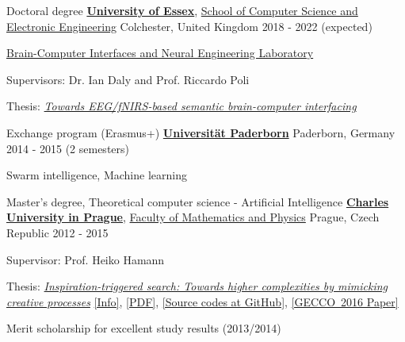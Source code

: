 

\begin{cventries}

  \cventry
    {Doctoral degree} %
    {\href{https://www.essex.ac.uk}{\textbf{University of Essex}}, \href{https://www.essex.ac.uk/departments/computer-science-and-electronic-engineering}{School of Computer Science and Electronic Engineering}} %
    {Colchester, United Kingdom} %
    {2018 - 2022 (expected)} %
    {
      \begin{cvitems} %
        \item {\href{http://essexbcis.uk}{Brain-Computer Interfaces and Neural Engineering Laboratory}}
        \item {Supervisors: Dr. Ian Daly and Prof. Riccardo Poli}
        \item {Thesis: \href{http://milanrybar.cz/semantic-brain-computer-interfacing}{\emph{Towards EEG/fNIRS-based semantic brain-computer interfacing}}}
      \end{cvitems}
    }

  \cventry
{Exchange program (Erasmus+)} %
{\href{http://www.uni-paderborn.de}{\textbf{Universität Paderborn}}} %
{Paderborn, Germany} %
{2014 - 2015 (2 semesters)} %
{
	\begin{cvitems} %
		\item {Swarm intelligence, Machine learning}
	\end{cvitems}
}

  \cventry
{Master's degree, Theoretical computer science - Artificial Intelligence} %
{\href{http://cuni.cz}{\textbf{Charles University in Prague}}, \href{http://www.mff.cuni.cz}
	{Faculty of Mathematics and Physics}} %
{Prague, Czech Republic} %
{2012 - 2015} %
{
	\begin{cvitems} %
		\item {Supervisor: Prof. Heiko Hamann}
		\item {Thesis: \href{http://milanrybar.cz/inspiration-triggered-search}{\emph{Inspiration-triggered search: Towards higher complexities by mimicking creative processes}} 
		\href{http://milanrybar.cz/inspiration-triggered-search}{[Info]}, 
		\href{http://milanrybar.cz/data/ITS/ITS_Thesis.pdf}{[PDF]}, 
		\href{https://github.com/milan-rybar/inspiration-triggered-search}{[Source codes at GitHub]}, 
		\href{http://milanrybar.cz/data/ITS/GECCO2016/ITS_GECCO2016_Paper.pdf}{[GECCO~2016 Paper]}
		}
	 \item {Merit scholarship for excellent study results (2013/2014)}
	\end{cvitems}
}


\end{cventries}
